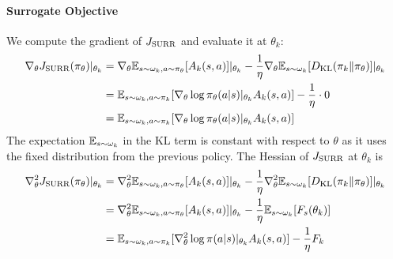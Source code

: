 \documentclass{article}
\theoremstyle{plain}
\theoremstyle{definition}
\theoremstyle{remark}
\begin{document}
\paragraph{Surrogate Objective}
We compute the gradient of $J_{\textup{SURR}}$ and evaluate it at $\theta_k$:
\begin{align*}
    \nabla_\theta J_{\textup{SURR}}(\pi_\theta) |_{\theta_k} &= \nabla_\theta \mathbb{E}_{s \sim \omega_k, a \sim \pi_\theta}[A_k(s,a)] |_{\theta_k} - \frac{1}{\eta} \nabla_\theta \mathbb{E}_{s \sim \omega_k} [D_{\mathrm{KL}}(\pi_k \| \pi_\theta)] |_{\theta_k} \\
    &= \mathbb{E}_{s \sim \omega_k, a \sim \pi_k} [\nabla_\theta \log \pi_\theta(a|s)|_{\theta_k} A_k(s,a)] - \frac{1}{\eta} \cdot 0 \\
    &= \mathbb{E}_{s \sim \omega_k, a \sim \pi_k} [\nabla_\theta \log \pi_\theta(a|s)|_{\theta_k} A_k(s,a)]
\end{align*}
The expectation $\mathbb{E}_{s \sim \omega_k}$ in the KL term is constant with respect to $\theta$ as it uses the fixed distribution from the previous policy.
The Hessian of $J_{\textup{SURR}}$ at $\theta_k$ is
\begin{align*}
    \nabla^2_\theta J_{\textup{SURR}}(\pi_\theta) |_{\theta_k} &= \nabla^2_\theta \mathbb{E}_{s \sim \omega_k, a \sim \pi_\theta}[A_k(s,a)] |_{\theta_k} - \frac{1}{\eta} \nabla^2_\theta \mathbb{E}_{s \sim \omega_k} [D_{\mathrm{KL}}(\pi_k \| \pi_\theta)] |_{\theta_k} \\
    &= \nabla^2_\theta \mathbb{E}_{s \sim \omega_k, a \sim \pi_\theta}[A_k(s,a)] |_{\theta_k} - \frac{1}{\eta} \mathbb{E}_{s \sim \omega_k} [F_s(\theta_k)] \\
    &= \mathbb{E}_{s \sim \omega_k, a \sim \pi_k}[\nabla^2_\theta\log \pi(a|s)|_{\theta_k} A_k(s,a)] - \frac{1}{\eta} F_k
\end{align*}
\end{document}
